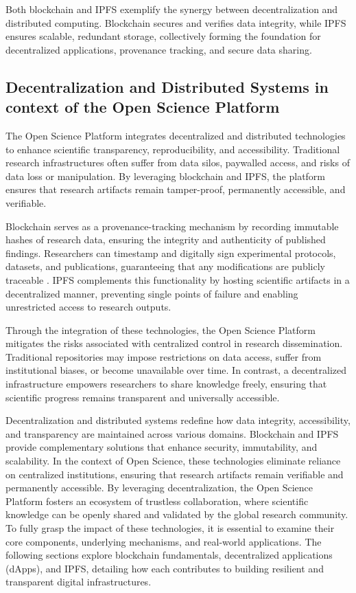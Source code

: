 \documentclass{article}
\begin{document}
Both blockchain and IPFS exemplify the synergy between decentralization and distributed computing. Blockchain secures and verifies data integrity, while IPFS ensures scalable, redundant storage, collectively forming the foundation for decentralized applications, provenance tracking, and secure data sharing.

\subsection{Decentralization and Distributed Systems in context of the Open Science Platform}

The Open Science Platform integrates decentralized and distributed technologies to enhance scientific transparency, reproducibility, and accessibility. Traditional research infrastructures often suffer from data silos, paywalled access, and risks of data loss or manipulation. By leveraging blockchain and IPFS, the platform ensures that research artifacts remain tamper-proof, permanently accessible, and verifiable.

Blockchain serves as a provenance-tracking mechanism by recording immutable hashes of research data, ensuring the integrity and authenticity of published findings. Researchers can timestamp and digitally sign experimental protocols, datasets, and publications, guaranteeing that any modifications are publicly traceable \cite{bonneau2015sok}. IPFS complements this functionality by hosting scientific artifacts in a decentralized manner, preventing single points of failure and enabling unrestricted access to research outputs.

Through the integration of these technologies, the Open Science Platform mitigates the risks associated with centralized control in research dissemination. Traditional repositories may impose restrictions on data access, suffer from institutional biases, or become unavailable over time. In contrast, a decentralized infrastructure empowers researchers to share knowledge freely, ensuring that scientific progress remains transparent and universally accessible.

Decentralization and distributed systems redefine how data integrity, accessibility, and transparency are maintained across various domains. Blockchain and IPFS provide complementary solutions that enhance security, immutability, and scalability. In the context of Open Science, these technologies eliminate reliance on centralized institutions, ensuring that research artifacts remain verifiable and permanently accessible. By leveraging decentralization, the Open Science Platform fosters an ecosystem of trustless collaboration, where scientific knowledge can be openly shared and validated by the global research community. To fully grasp the impact of these technologies, it is essential to examine their core components, underlying mechanisms, and real-world applications. The following sections explore blockchain fundamentals, decentralized applications (dApps), and IPFS, detailing how each contributes to building resilient and transparent digital infrastructures.
\end{document}

